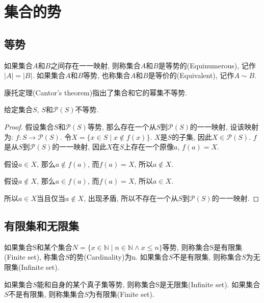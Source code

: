 \chapter{集合的势}
\section{等势}
\begin{definition}[等势]
	如果集合$A$和$B$之间存在一一映射, 则称集合$A$和$B$是等势的(Equinumerous), 记作$|A|=|B|$. 如果集合$A$和$B$等势, 也称集合$A$和$B$是等价的(Equivalent), 记作$A\sim B$.
\end{definition}

康托定理(Cantor's theorem)指出了集合和它的幂集不等势.

\begin{theorem}[]
	给定集合$S$, $S$和$\mathscr P(S)$不等势.
\end{theorem}

\begin{proof}
	假设集合$S$和$\mathscr P(S)$等势, 那么存在一个从$S$到$\mathscr P(S)$的一一映射, 设该映射为: $f\colon S\rightarrow \mathscr P(S)$. 令$X=\{x\in S\mid x\notin f(x)\}$. $X$是$S$的子集, 因此$X\in \mathscr P(S)$. $f$是从$S$到$\mathscr P(S)$的一一映射, 因此$X$在$S$上存在一个原像$a$, $f(a)=X$.

	假设$a\in X$, 那么$a\notin f(a)$, 而$f(a)=X$, 所以$a\notin X$.

	假设$a\notin X$, 那么$a\in f(a)$, 而$f(a)=X$, 所以$a\in X$.

	所以$a\in X$当且仅当$a\notin X$, 出现矛盾, 所以不存在一个从$S$到$\mathscr P(S)$的一一映射.
\end{proof}

\section{有限集和无限集}
\begin{definition}[有限集和无限集的定义1]
	如果集合S和某个集合$N=\{x\in \mathbb{N}\mid n\in \mathbb{N}\wedge x\leqslant n\}$等势, 则称集合S是有限集(Finite set), 称集合$S$的势(Cardinality)为n. 如果集合$S$不是有限集, 则称集合$S$为无限集(Infinite set).
\end{definition}

\begin{definition}
	如果集合$S$能和自身的某个真子集等势, 则称集合S是无限集(Infinite set). 如果集合$S$不是有限集, 则称集集合$S$为有限集(Finite set).
\end{definition}

